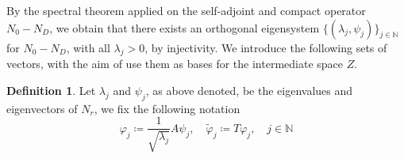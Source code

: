 \documentclass[10pt, a4paper, twoside, openright]{book}
\theoremstyle{definition}
\newtheorem{definition}[subsection]{Definition}
\theoremstyle{plain}
\theoremstyle{plain}
\theoremstyle{plain}
\theoremstyle{plain}
\theoremstyle{plain}
\theoremstyle{plain}
\theoremstyle{plain}
\theoremstyle{plain}
\let\phi\varphi
\begin{document}
% 
% 
By the spectral theorem applied on the self-adjoint and compact operator ${N_0}- {N_D}$, we obtain that there exists
an orthogonal eigensystem $\{(\lambda_j, \psi_j)\}_{j\in\mathbb{N}}$ for ${N_0} - {N_D}$,
with all $\lambda_j>0$, by injectivity.
We introduce the following sets of vectors, with the aim of use them as bases for the intermediate space $Z$.
\begin{definition}
Let $\lambda_j$ and $\psi_j$, as above denoted, be the eigenvalues and eigenvectors of ${N_r}$, we fix the following notation
\begin{equation}
 \phi_j\coloneqq \frac{1}{\sqrt{\lambda_j}}A\psi_j, \quad \tilde{\phi}_j\coloneqq T\phi_j,\quad j\in\mathbb{N} 
\end{equation}
\end{definition}
\end{document}
